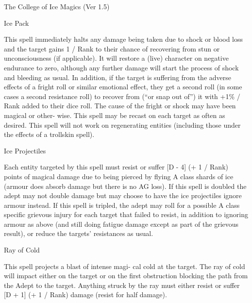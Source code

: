 \begin{Chapter}{The College of Ice Magics (Ver 1.5)}
\begin{spell}[S-10]{Ice Pack}
\begin{effects}
This spell immediately halts any damage being taken due to shock or
blood loss and the target gains 1 / Rank to their chance of recovering
from stun or unconsciousness (if applicable). It will restore a (live)
character on negative endurance to zero, although any further damage
will start the process of shock and bleeding as usual. In addition, if
the target is suffering from the adverse effects of a fright roll or
similar emotional effect, they get a second roll (in some cases a
second resistance roll) to recover from (“or snap out of”) it with
+1\% / Rank added to their dice roll.  The cause of the fright or
shock may have been magical or other- wise.  This spell may be recast
on each target as often as desired. This spell will not work on
regenerating entities (including those under the effects of a
trollskin spell).
\end{effects}
\end{spell}

\begin{spell}[S-11]{Ice Projectiles}

\begin{effects}
Each entity targeted by this spell must resist or suffer [D - 4] (+ 1
/ Rank) points of magical damage due to being pierced by flying A
class shards of ice (armour does absorb damage but there is no AG
loss).  If this spell is doubled the adept may not double damage but
may choose to have the ice projectiles ignore armour instead.  If this
spell is tripled, the adept may roll for a possible A class specific
grievous injury for each target that failed to resist, in addition to
ignoring armour as above (and still doing fatigue damage except as
part of the grievous result), or reduce the targets’ resistances as
usual.
\end{effects}
\end{spell}

\begin{spell}[S-12]{Ray of Cold}
\begin{effects}
This spell projects a blast of intense magi- cal cold at the target.
The ray of cold will impact either on the target or on the first
obstruction blocking the path from the Adept to the target.  Anything
struck by the ray must either resist or suffer [D + 1] (+ 1 / Rank)
damage (resist for half damage).
\end{effects}
\end{spell}


\end{Chapter}
